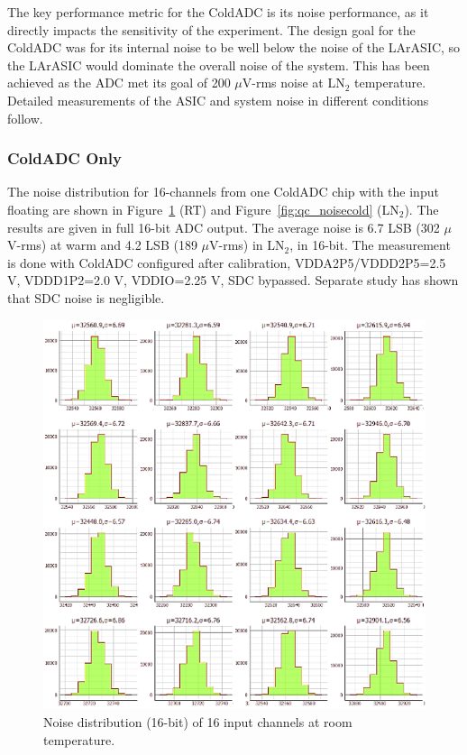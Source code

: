\label{sec:4.1}

The key performance metric for the ColdADC is its noise performance, as it directly impacts the 
sensitivity of the experiment. The design goal for the ColdADC was for its internal noise to be well 
below the noise of the LArASIC, so the LArASIC would dominate the overall noise of the system. 
This has been achieved as the ADC met its goal of 200 $\mu$V-rms noise at LN$_2$ temperature. 
Detailed measurements of the ASIC and system noise in different conditions follow.

\subsubsection{ColdADC Only}
The noise distribution for 16-channels from one ColdADC chip with the input floating are shown in Figure~\ref{fig:qc_noisewarm} (RT) and Figure~\ref{fig:qc_noisecold} (LN$_2$). The results are given in full 16-bit ADC output. The average noise is 6.7 LSB (302 $\mu$V-rms) at warm and 4.2 LSB (189 $\mu$V-rms) in LN$_2$, in 16-bit. The measurement is done with ColdADC configured after calibration, VDDA2P5/VDDD2P5=2.5 V, VDDD1P2=2.0 V, VDDIO=2.25 V, SDC bypassed. Separate study has shown that SDC noise is negligible. 
\begin{figure}[h!]
\centering
  \includegraphics[width=0.8\linewidth]{figures/qc_noisewarm.png}
  \caption{Noise distribution (16-bit) of 16 input channels at room temperature.}
  \label{fig:qc_noisewarm}
\end{figure}
